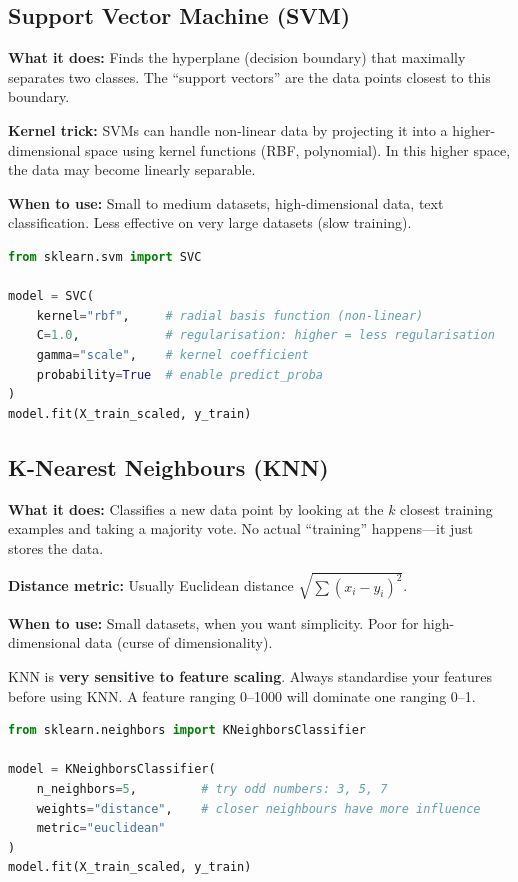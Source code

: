 \documentclass[12pt, a4paper, oneside]{book}
\begin{document}
\subsection{Support Vector Machine (SVM)}

\textbf{What it does:} Finds the hyperplane (decision boundary) that maximally separates two classes. The ``support vectors'' are the data points closest to this boundary.

\textbf{Kernel trick:} SVMs can handle non-linear data by projecting it into a higher-dimensional space using kernel functions (RBF, polynomial). In this higher space, the data may become linearly separable.

\textbf{When to use:} Small to medium datasets, high-dimensional data, text classification. Less effective on very large datasets (slow training).

\begin{lstlisting}[language=Python, caption={SVM classifier}]
from sklearn.svm import SVC

model = SVC(
    kernel="rbf",     # radial basis function (non-linear)
    C=1.0,            # regularisation: higher = less regularisation
    gamma="scale",    # kernel coefficient
    probability=True  # enable predict_proba
)
model.fit(X_train_scaled, y_train)
\end{lstlisting}

\subsection{K-Nearest Neighbours (KNN)}

\textbf{What it does:} Classifies a new data point by looking at the $k$ closest training examples and taking a majority vote. No actual ``training'' happens---it just stores the data.

\textbf{Distance metric:} Usually Euclidean distance $\sqrt{\sum (x_i - y_i)^2}$.

\textbf{When to use:} Small datasets, when you want simplicity. Poor for high-dimensional data (curse of dimensionality).

\begin{warningbox}
KNN is \textbf{very sensitive to feature scaling}. Always standardise your features before using KNN. A feature ranging 0--1000 will dominate one ranging 0--1.
\end{warningbox}

\begin{lstlisting}[language=Python, caption={KNN classifier}]
from sklearn.neighbors import KNeighborsClassifier

model = KNeighborsClassifier(
    n_neighbors=5,         # try odd numbers: 3, 5, 7
    weights="distance",    # closer neighbours have more influence
    metric="euclidean"
)
model.fit(X_train_scaled, y_train)
\end{lstlisting}
\end{document}
